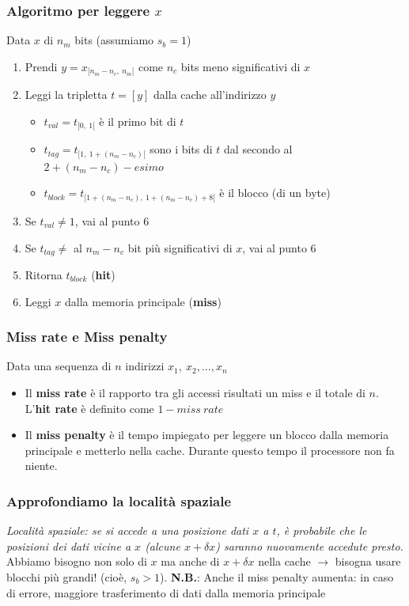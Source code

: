 \documentclass[12pt,a4paper]{article}
\begin{document}
\subsubsection{Algoritmo per leggere $x$}
Data $x$ di $n_m$ bits (assumiamo $s_b = 1$)
\begin{enumerate}
\item Prendi $y=x_{[n_m-n_c,\ n_m[}$ come $n_c$ bits meno significativi di $x$
\item Leggi la tripletta $t = [y]$ dalla cache all'indirizzo $y$
\begin{itemize}
\item $t_{val} = t_{[0,\ 1[}$ è il primo bit di $t$
\item $t_{tag} = t_{[1,\ 1+(n_m-n_c)[}$ sono i bits di $t$ dal secondo al $2+(n_m -n_c) -esimo$
\item $t_{block} = t_{[1+(n_m-n_c),\ 1+(n_m-n_c)+8[}$ è il blocco (di un byte)
\end{itemize}
\item Se $t_{val} \not = 1$, vai al punto 6
\item Se $t_{tag} \not = $ al $n_m - n_c$ bit più significativi di $x$, vai al punto 6
\item Ritorna $t_{block}$ (\textbf{hit})
\item Leggi $x$ dalla memoria principale (\textbf{miss})
\end{enumerate}

\subsubsection{Miss rate e Miss penalty}
Data una sequenza di $n$ indirizzi $x_1,\ x_2, \dots, x_n$\\
\begin{itemize}
\item Il \textbf{miss rate} è il rapporto tra gli accessi risultati un miss e il totale di $n$. L'\textbf{hit rate} è definito come $1 - miss\ rate$
\item Il \textbf{miss penalty} è il tempo impiegato per leggere un blocco dalla memoria principale e metterlo nella cache. Durante questo tempo il processore non fa niente.
\end{itemize}

\subsubsection{Approfondiamo la località spaziale}
\textsl{Località spaziale: se si accede a una posizione dati $x$ a $t$, è probabile che le posizioni dei dati vicine a $x$ (alcune $x + \delta x$) saranno nuovamente accedute presto.}\\
Abbiamo bisogno non solo di $x$ ma anche di $x + \delta x$ nella cache $\rightarrow$ bisogna usare blocchi più grandi! (cioè, $s_b > 1$). 
\textbf{N.B.}: Anche il miss penalty aumenta: in caso di errore, maggiore trasferimento di dati dalla memoria principale
\end{document}
